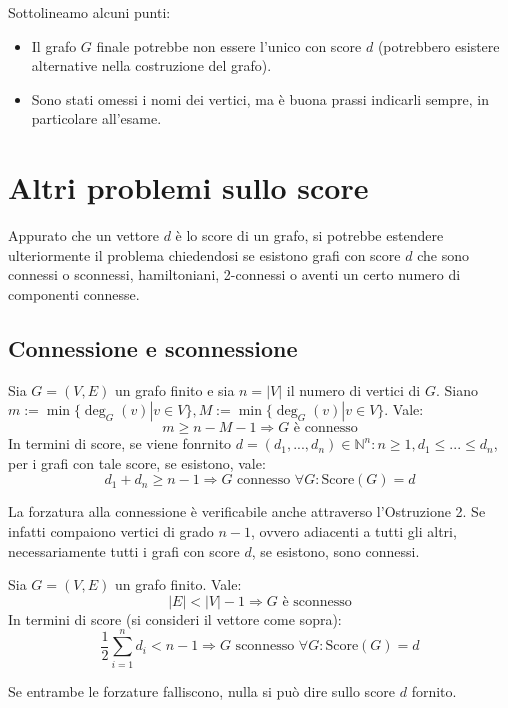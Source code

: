 \noindent Sottolineamo alcuni punti:
\begin{itemize}
    \item Il grafo $G$ finale potrebbe non essere l'unico con score $d$ (potrebbero esistere alternative nella costruzione del grafo).
    \item Sono stati omessi i nomi dei vertici, ma è buona prassi indicarli sempre, in particolare all'esame.
\end{itemize}



\section{Altri problemi sullo score}
Appurato che un vettore $d$ è lo score di un grafo, si potrebbe
estendere ulteriormente il problema chiedendosi se esistono
grafi con score $d$ che sono connessi o sconnessi, hamiltoniani,
2-connessi o aventi un certo numero di componenti connesse.

\subsection*{Connessione e sconnessione}
\begin{tcolorbox}[colback=red!30, colframe=red!30!black, title=Forzatura alla connessione]
Sia $G=(V,E)$ un grafo  finito e sia $n=|V|$ il numero
di vertici di $G$. Siano $m:=\min\{\deg_G(v)|v\in V\},
M:=\min\{\deg_G(v)|v\in V\}$. Vale:
\[ m\geq n-M-1 \Longrightarrow G \text{ è connesso} \]
In termini di score, se viene fonrnito $d=(d_1,...,d_n)\in\mathbb{N}^n:
n\geq1, d_1\leq...\leq d_n$, per i grafi con tale score, se
esistono, vale:
\[ d_1+d_n \geq n-1 \Longrightarrow G\text{ connesso }\forall G:\text{Score}(G)=d \]
\end{tcolorbox}
\begin{osservaz}
La forzatura alla connessione è verificabile
anche attraverso l'Ostruzione 2. Se infatti compaiono vertici di grado
$n-1$, ovvero adiacenti a tutti gli altri, necessariamente tutti i
grafi con score $d$, se esistono, sono connessi.
\end{osservaz}

\begin{tcolorbox}[colback=red!30, colframe=red!30!black, title=Forzatura alla sconnessione]
Sia $G=(V,E)$ un grafo finito. Vale:
\[ |E|<|V|-1 \Longrightarrow G \text{ è sconnesso} \]
In termini di score (si consideri il vettore come sopra):
\[ \frac12\sum_{i=1}^{n}d_i < n-1 \Longrightarrow G\text{ sconnesso } \forall G:\text{Score}(G)=d \]
\end{tcolorbox}
\begin{osservaz}
Se entrambe le forzature falliscono, nulla si può dire sullo score $d$ fornito.
\end{osservaz}

